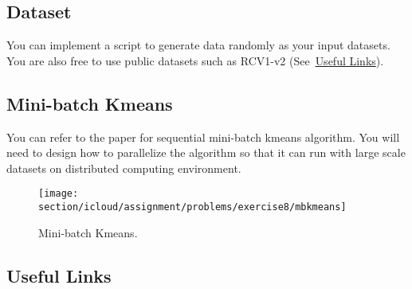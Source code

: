 \subsection*{Dataset}

You can implement a script to generate data randomly as your input
datasets.  You are also free to use public datasets such as RCV1-v2
(See~\hyperlink{link_exercise8}{Useful Links}).
  
\subsection*{Mini-batch Kmeans}

You can refer to the paper for sequential mini-batch kmeans
algorithm. You will need to design how to parallelize the algorithm so
that it can run with large scale datasets on distributed computing
environment.

\begin{figure}[htb]
\texttt{[image: section/icloud/assignment/problems/exercise8/mbkmeans]}
\centering
\caption{Mini-batch Kmeans.}
\end{figure}  

\subsection*{Useful Links}

